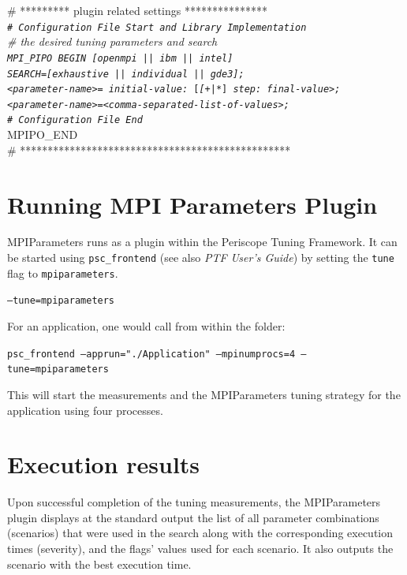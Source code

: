 \documentclass[11pt,a4paper, oneside]{book} %
\newenvironment{code}%
{
\addtolength{\leftskip}{0.5cm}}%
{

}
\begin{document}
\begin{code}

\# ********* plugin related settings *************** \\
\texttt{\textit{\# Configuration File Start and Library Implementation}} \\
	\textit{\# the desired tuning parameters and search} \\
	\texttt{\textit{MPI\_PIPO BEGIN} \textit{[openmpi || ibm || intel]} }\\
	\texttt{\textit{SEARCH=[exhaustive || individual || gde3];}}\\
	\texttt{\textit{<parameter-name>= initial-value:} [\textit{[+|*}] 				 	\textit{step: final-value>;}}\\
	\texttt{\textit{<parameter-name>=<comma-separated-list-of-values>;}}\\
	\texttt{\textit{\# Configuration File End}}\\
	MPIPO\_END\\
\# *************************************************
\end{code}

\section{Running MPI Parameters Plugin}
MPIParameters runs as a plugin within the Periscope Tuning Framework. It can be started using \texttt{psc\_frontend} (see also \textit{PTF User's Guide}) by setting the \texttt{tune} flag to \texttt{mpiparameters}.
\begin{center}
\texttt{--tune=mpiparameters}
\end{center}

For an application, one would call from within the folder:
\vspace*{0.5cm}

\texttt{psc\_frontend --apprun="./Application" --mpinumprocs=4 --tune=mpiparameters}

\vspace*{0.5cm}
This will start the measurements and the MPIParameters tuning strategy for the application using four processes.

\section{Execution results}
Upon successful completion of the tuning measurements, the MPIParameters plugin displays at the standard output the list of all parameter combinations (scenarios) that were used in the search along with the corresponding execution times (severity), and the flags' values used for each scenario. It also outputs the scenario with the best execution time.
\end{document}
